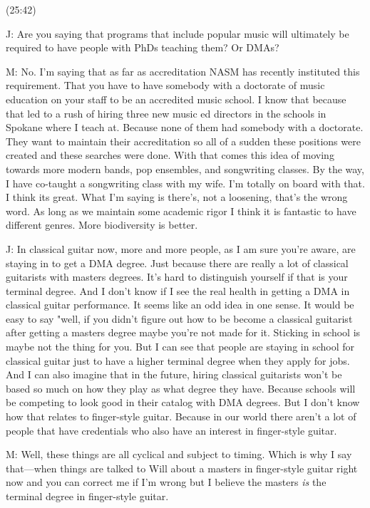 \documentclass[11pt]{article}
\begin{document}
(25:42)

J: Are you saying that programs that include popular music will ultimately be required to have people with PhDs teaching them? Or DMAs?

M: No. I'm saying that as far as accreditation NASM has recently instituted this requirement. That you have to have somebody with a doctorate of music education on your staff to be an accredited music school. I know that because that led to a rush of hiring three new music ed directors in the schools in Spokane where I teach at. Because none of them had somebody with a doctorate. They want to maintain their accreditation so all of a sudden these positions were created and these searches were done. With that comes this idea of moving towards more modern bands, pop ensembles, and songwriting classes. By the way, I have co-taught a songwriting class with my wife. I'm totally on board with that. I think its great. What I'm saying is there's, not a loosening, that's the wrong word. As long as we maintain some academic rigor I think it is fantastic to have different genres. More biodiversity is better. 

J: In classical guitar now, more and more people, as I am sure you're aware, are staying in to get a DMA degree. Just because there are really a lot of classical guitarists with masters degrees. It's hard to distinguish yourself if that is your terminal degree. And I don't know if I see the real health in getting a DMA in classical guitar performance. It seems like an odd idea in one sense. It would be easy to say "well, if you didn't figure out how to be become a classical guitarist after getting a masters degree maybe you're not made for it. Sticking in school is maybe not the thing for you. But I can see that people are staying in school for classical guitar just to have a higher terminal degree when they apply for jobs. And I can also imagine that in the future, hiring classical guitarists won't be based so much on how they play as what degree they have. Because schools will be competing to look good in their catalog with DMA degrees. But I don't know how that relates to finger-style guitar.  Because in our world there aren't a lot of people that have credentials who also have an interest in finger-style guitar. 

M: Well, these things are all cyclical and subject to timing. Which is why I say that—when things are talked to Will about a masters in finger-style guitar right now and you can correct me if I'm wrong but I believe the masters \emph{is} the terminal degree in finger-style guitar.
\end{document}
